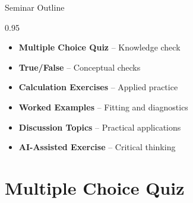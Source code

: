 \documentclass[9pt, aspectratio=169, t]{beamer}
\subtitle{Seminar 2: ARMA Models}
\begin{document}
{
\begin{frame}
    \titlepage
\end{frame}
}


\begin{frame}{Seminar Outline}
    \begin{cminipage}{0.95\textwidth}
    \begin{itemize}
        \item \textbf{Multiple Choice Quiz} -- Knowledge check
        \vspace{0.15cm}
        \item \textbf{True/False} -- Conceptual checks
        \vspace{0.15cm}
        \item \textbf{Calculation Exercises} -- Applied practice
        \vspace{0.15cm}
        \item \textbf{Worked Examples} -- Fitting and diagnostics
        \vspace{0.15cm}
        \item \textbf{Discussion Topics} -- Practical applications
        \vspace{0.15cm}
        \item \textbf{AI-Assisted Exercise} -- Critical thinking
    \end{itemize}
    \end{cminipage}
\end{frame}

\section{Multiple Choice Quiz}
\end{document}
